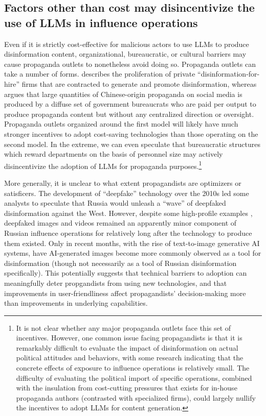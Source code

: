 \documentclass{article}
\begin{document}
\subsection{Factors other than cost may disincentivize the use of LLMs in influence operations}
\label{sec:bureaucracy}

Even if it is strictly cost-effective for malicious actors to use LLMs to produce disinformation content, organizational, bureaucratic, or cultural barriers may cause propaganda outlets to nonetheless avoid doing so. Propaganda outlets can take a number of forms. \cite{fisher} describes the proliferation of private ``disinformation-for-hire'' firms that are contracted to generate and promote disinformation, whereas \cite{king} argues that large quantities of Chinese-origin propaganda on social media is produced by a diffuse set of government bureaucrats who are paid per output to produce propaganda content but without any centralized direction or oversight. Propaganda outlets organized around the first model will likely have much stronger incentives to adopt cost-saving technologies than those operating on the second model. In the extreme, we can even speculate that bureaucratic structures which reward departments on the basis of personnel size may actively disincentivize the adoption of LLMs for propaganda purposes.\footnote{It is not clear whether any major propaganda outlets face this set of incentives. However, one common issue facing propagandists is that it is remarkably difficult to evaluate the impact of disinformation on actual political attitudes and behaviors, with some research indicating that the concrete effects of exposure to influence operations is relatively small. \cite{nature} The difficulty of evaluating the political import of specific operations, combined with the insulation from cost-cutting pressures that exists for in-house propaganda authors (contrasted with specialized firms), could largely nullify the incentives to adopt LLMs for content generation.}

More generally, it is unclear to what extent propagandists are optimizers or satisficers. The development of ``deepfake'' technology over the 2010s led some analysts to speculate that Russia would unleash a ``wave'' of deepfaked disinformation against the West. \cite{wave} However, despite some high-profile examples \cite{zelenskyy}, deepfaked images and videos remained an apparently minor component of Russian influence operations for relatively long after the technology to produce them existed. Only in recent months, with the rise of text-to-image generative AI systems, have AI-generated images become more commonly observed as a tool for disinformation (though not necessarily as a tool of Russian disinformation specifically). \cite{trump, putin} This potentially suggests that technical barriers to adoption can meaningfully deter propgandists from using new technologies, and that improvements in user-friendliness affect propagandists' decision-making more than improvements in underlying capabilities. 
\end{document}
